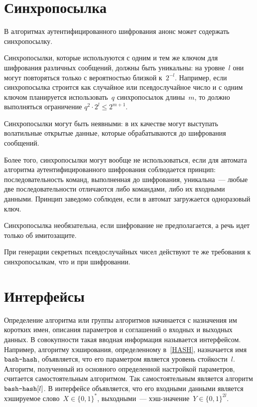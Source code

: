 \section{Синхропосылка}\label{COMMON.Nonce}

В алгоритмах аутентифицированного шифрования анонс может содержать 
синхропосылку.

Синхропосылки, которые используются с одним и тем же ключом для шифрования 
различных сообщений, должны быть уникальны: на уровне~$l$ они могут повторяться 
только с вероятностью близкой к~$2^{-l}$. Например, если синхропосылка строится 
как случайное или псевдослучайное число и с одним ключом планируется 
использовать~$q$ синхропосылок длины~$m$, то должно выполняться ограничение
$q^2\cdot 2^l\leq 2^{m+1}$.

Синхропосылки могут быть неявными: в их качестве могут выступать волатильные 
открытые данные, которые обрабатываются до шифрования сообщений.

Более того, синхропосылки могут вообще не использоваться, если 
для автомата алгоритма аутентифицированного шифрования
соблюдается принцип: последовательность команд, выполненная до шифрования, 
уникальна~--- любые две последовательности отличаются либо командами,
либо их входными данными.
%
Принцип заведомо соблюден, если в автомат загружается одноразовый ключ.

Синхропосылка необязательна, если шифрование не 
предполагается, а речь идет только об имитозащите.

При генерации секретных псевдослучайных чисел действуют те же требования к 
синхропосылкам, что и при шифровании.

\section{Интерфейсы}\label{COMMON.IFace}

Определение алгоритма или группы алгоритмов начинается с назначения им 
коротких имен, описания параметров и соглашений о входных и выходных данных.
В совокупности такая вводная информация называется интерфейсом.
%
Например, алгоритму хэширования, определенному в~\ref{HASH}, назначается
имя~$\texttt{bash-hash}$, объявляется, что его параметром является уровень
стойкости~$l$. 
%
Алгоритм, полученный из основного определенной настройкой параметров,
считается самостоятельным алгоритмом. Так\addendum{,} самостоятельным является 
алгоритм $\texttt{bash-hash}[l]$. 
%
В интерфейсе объявляется, что его входными данными является хэшируемое 
слово~$X\in\{0,1\}^*$, выходными~--- хэш-значение~$Y\in\{0,1\}^{2l}$.

